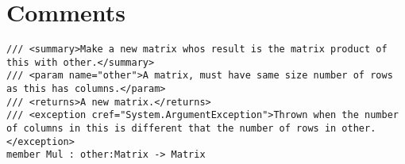 \chapter{Comments}
\label{chap:comments}



\begin{lstlisting}
/// <summary>Make a new matrix whos result is the matrix product of this with other.</summary>
/// <param name="other">A matrix, must have same size number of rows as this has columns.</param>
/// <returns>A new matrix.</returns>
/// <exception cref="System.ArgumentException">Thrown when the number of columns in this is different that the number of rows in other.</exception>
member Mul : other:Matrix -> Matrix

\end{lstlisting}

